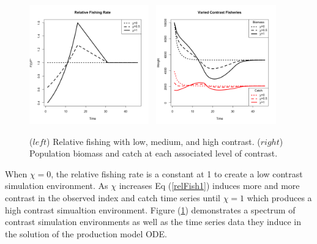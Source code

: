 \documentclass[12pt]{article}
\begin{document}


%
\begin{figure}[h!]
\centering
\includegraphics[width=0.46\textwidth]{../ptNew/relFish.png}
$~$
\includegraphics[width=0.46\textwidth]{../ptNew/relSeries.png}
\caption{ \label{catchT45}
($left$) Relative fishing with low, medium, and high contrast.
($right$) Population biomass and catch at each associated level of contrast. %
}
\label{catch45}
\end{figure}
%
\clearpage
%
When $\chi=0$, the relative fishing rate is a constant at 1 to create a low 
contrast simulation environment. As $\chi$ increases Eq (\ref{relFish1}) 
induces more and more contrast in the observed index and catch time series 
until $\chi=1$ which produces a high contrast simualtion environment. 
Figure (\ref{catch45}) demonstrates a spectrum of contrast simulation 
environments as well as the time series data they induce in the solution of 
the production model ODE. 
\end{document}
